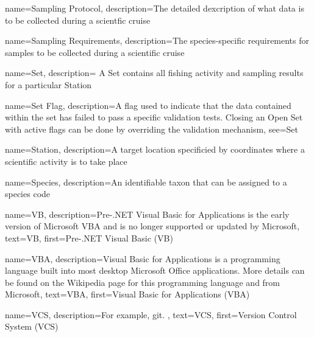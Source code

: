  {
  name=Sampling Protocol,
  description={The detailed dexcription of what data is to be collected during a scientfic cruise}
}

 {
  name=Sampling Requirements,
  description={The species-specific requirements for samples to be collected during a scientific cruise}
}

 {
  name=Set,
  description={
    A Set contains all fishing activity and sampling results for a particular \gls{Station}
  }
}

 {
  name=Set Flag,
  description={A flag used to indicate that the data contained within the set has failed to pass a specific validation tests.
  Closing an \gls{Open Set} with active flags can be done by overriding the validation mechanism},
  see=\gls{Set}
  }

 {
  name=Station,
  description={A target location specificied by coordinates where a scientific activity is to take place}
}

 {
  name=Species,
  description={An identifiable taxon that can be assigned to a species code}
}

 {
  name=VB,
  description={Pre-.NET Visual Basic for Applications is the early version of Microsoft VBA and is no longer supported or updated by Microsoft},
  text={VB},
  first={Pre-.NET Visual Basic (VB)}
}

 {
  name=VBA,
  description={Visual Basic for Applications is a programming language built into most desktop Microsoft Office applications. More details can be found on the Wikipedia page for this programming language and from Microsoft},
  text={VBA},
  first={Visual Basic for Applications (VBA)}
}

 {
  name=VCS,
  description={For example, git. },
  text={VCS},
  first={Version Control System (VCS)}
}



\glsaddall
\glsaddallunused
